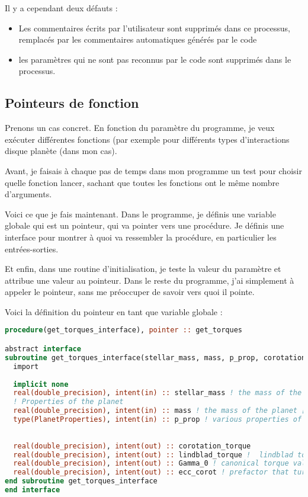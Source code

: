 Il y a cependant deux défauts : 
\begin{itemize}
\item Les commentaires écrits par l'utilisateur sont supprimés dans ce processus, remplacés par les commentaires automatiques générés par le code
\item les paramètres qui ne sont pas reconnus par le code sont supprimés dans le processus. 
\end{itemize}

\subsection{Pointeurs de fonction}
Prenons un cas concret. En fonction du paramètre du programme, je veux exécuter différentes fonctions (par exemple pour différents types d'interactions disque planète (dans mon cas). 

Avant, je faisais à chaque pas de temps dans mon programme un test pour choisir quelle fonction lancer, sachant que toutes les fonctions ont le même nombre d'arguments. 

\bigskip

Voici ce que je fais maintenant. Dans le programme, je définis une variable globale qui est un pointeur, qui va pointer vers une procédure. Je définis une interface pour montrer à quoi va ressembler la procédure, en particulier les entrées-sorties. 

Et enfin, dans une routine d'initialisation, je teste la valeur du paramètre et attribue une valeur au pointeur. Dans le reste du programme, j'ai simplement à appeler le pointeur, sans me préoccuper de savoir vers quoi il pointe.

Voici la définition du pointeur en tant que variable globale : 
\begin{lstlisting}[language=Fortran]
procedure(get_torques_interface), pointer :: get_torques

abstract interface 
subroutine get_torques_interface(stellar_mass, mass, p_prop, corotation_torque, lindblad_torque, Gamma_0, ecc_corot)
  import 
  
  implicit none
  real(double_precision), intent(in) :: stellar_mass ! the mass of the central body [Msun * K2]
  ! Properties of the planet
  real(double_precision), intent(in) :: mass ! the mass of the planet [Msun * K2]
  type(PlanetProperties), intent(in) :: p_prop ! various properties of the planet
  
  
  real(double_precision), intent(out) :: corotation_torque
  real(double_precision), intent(out) :: lindblad_torque !  lindblad torque exerted by the disk on the planet [\Gamma_0]
  real(double_precision), intent(out) :: Gamma_0 ! canonical torque value [Ms.AU^2](equation (8) of Paardekooper, Baruteau, 2009)
  real(double_precision), intent(out) :: ecc_corot ! prefactor that turns out the corotation torque if the eccentricity is too high (Bitsch & Kley, 2010)
end subroutine get_torques_interface
end interface
\end{lstlisting}

